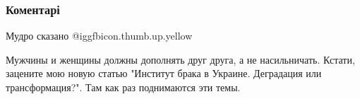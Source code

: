  
 
 
 
 
\subsubsection{Коментарі}

\begin{itemize} %
Мудро сказано  @igg{fbicon.thumb.up.yellow} 


Мужчины и женщины должны дополнять друг друга, а не насильничать. Кстати,
зацените мою новую статью "Институт брака в Украине. Деградация или
трансформация?". Там как раз поднимаются эти темы.

\end{itemize} %
